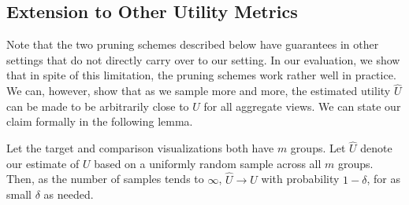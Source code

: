 

\subsection{Extension to Other Utility Metrics}



Note that the two pruning schemes described below have guarantees
in other settings that do not directly carry over to our setting.
In our evaluation, we show that in spite of this limitation, the pruning schemes
work rather well in practice. 
We can, however, show that as we sample more and more, the estimated utility
$\hat{U}$ can be made to be arbitrarily close to $U$ for all aggregate views.
We can state our claim formally in the following lemma. 

\begin{lemma}
Let the target and comparison visualizations
both have $m$ groups.
Let $\hat{U}$ denote our estimate of $U$ based on a uniformly random sample 
across all $m$ groups. 
Then, as the number of samples tends to $\infty$, $\hat{U} \rightarrow U$
with probability $1-\delta$, for as small $\delta$ as needed.
\end{lemma}